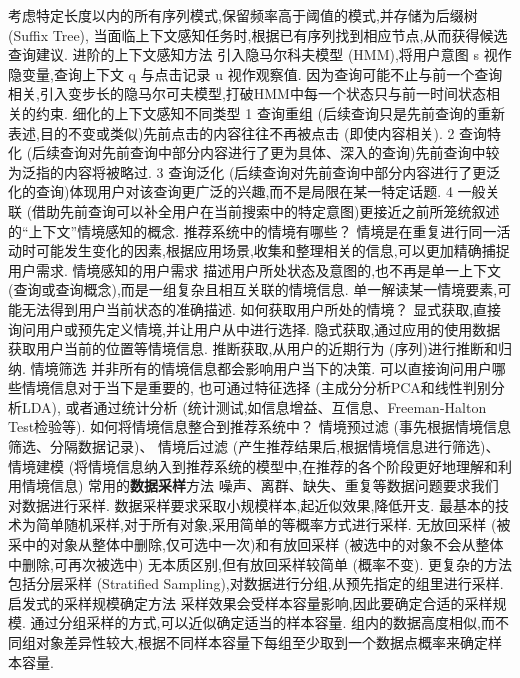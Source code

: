 \documentclass[10pt, utf8]{ctexart}
\begin{document}
\begin{multicols}{4}
    考虑特定长度以内的所有序列模式,保留频率高于阈值的模式,并存储为后缀树 (Suffix Tree),
    当面临上下文感知任务时,根据已有序列找到相应节点,从而获得候选查询建议.
    {\color{blue}进阶的上下文感知方法}
    引入隐马尔科夫模型 (HMM),将用户意图 s 视作隐变量,查询上下文 q 与点击记录 u 视作观察值.
    因为查询可能不止与前一个查询相关,引入变步长的隐马尔可夫模型,打破HMM中每一个状态只与前一时间状态相关的约束.
    {\color{blue}细化的上下文感知不同类型}
    1 查询重组 (后续查询只是先前查询的重新表述,目的不变或类似)先前点击的内容往往不再被点击 (即使内容相关).
    2 查询特化 (后续查询对先前查询中部分内容进行了更为具体、深入的查询)先前查询中较为泛指的内容将被略过.
    3 查询泛化 (后续查询对先前查询中部分内容进行了更泛化的查询)体现用户对该查询更广泛的兴趣,而不是局限在某一特定话题.
    4 一般关联 (借助先前查询可以补全用户在当前搜索中的特定意图)更接近之前所笼统叙述的“上下文”情境感知的概念.
    {\color{blue}推荐系统中的情境有哪些？}
    情境是在重复进行同一活动时可能发生变化的因素,根据应用场景,收集和整理相关的信息,可以更加精确捕捉用户需求.
    {\color{blue}情境感知的用户需求}
    描述用户所处状态及意图的,也不再是单一上下文 (查询或查询概念),而是一组复杂且相互关联的情境信息.
    单一解读某一情境要素,可能无法得到用户当前状态的准确描述.
    {\color{blue}如何获取用户所处的情境？}
    显式获取,直接询问用户或预先定义情境,并让用户从中进行选择.
    隐式获取,通过应用的使用数据获取用户当前的位置等情境信息.
    推断获取,从用户的近期行为 (序列)进行推断和归纳.
    {\color{blue}情境筛选}
    并非所有的情境信息都会影响用户当下的决策.
    可以直接询问用户哪些情境信息对于当下是重要的,
    也可通过特征选择 (主成分分析PCA和线性判别分析LDA),
    或者通过统计分析 (统计测试,如信息增益、互信息、Freeman-Halton Test检验等).
        {\color{blue}如何将情境信息整合到推荐系统中？}
    情境预过滤 (事先根据情境信息筛选、分隔数据记录)、
    情境后过滤 (产生推荐结果后,根据情境信息进行筛选)、
    情境建模 (将情境信息纳入到推荐系统的模型中,在推荐的各个阶段更好地理解和利用情境信息)
    {\color{purple_}常用的\textbf{数据采样}方法}
    噪声、离群、缺失、重复等数据问题要求我们对数据进行采样.
    数据采样要求采取小规模样本,起近似效果,降低开支.
    最基本的技术为简单随机采样,对于所有对象,采用简单的等概率方式进行采样.
    无放回采样 (被采中的对象从整体中删除,仅可选中一次)和有放回采样 (被选中的对象不会从整体中删除,可再次被选中)
    无本质区别,但有放回采样较简单 (概率不变).
    更复杂的方法包括分层采样 (Stratified Sampling),对数据进行分组,从预先指定的组里进行采样.
    {\color{blue}启发式的采样规模确定方法}
    采样效果会受样本容量影响,因此要确定合适的采样规模.
    通过分组采样的方式,可以近似确定适当的样本容量.
    组内的数据高度相似,而不同组对象差异性较大,根据不同样本容量下每组至少取到一个数据点概率来确定样本容量.

\end{multicols}
\end{document}
